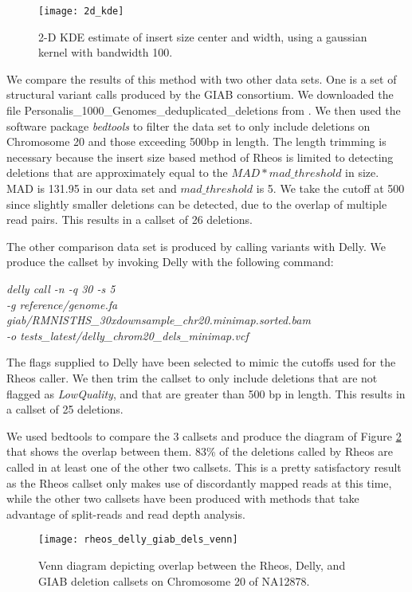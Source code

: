 \begin{figure}[H]
    \texttt{[image: 2d\_kde]}
    \centering
    \caption {2-D KDE estimate of insert size center and width, using a gaussian kernel with bandwidth 100.}
    \label{fig:2d_kde}
\end{figure}

We compare the results of this method with two other data sets. One is a set of structural variant calls produced by the GIAB consortium. We downloaded the file Personalis\_1000\_Genomes\_deduplicated\_deletions from \autocite{giab_svs}. We then used the software package \emph{bedtools}\autocite{quinlan2010bedtools} to filter the data set to only include deletions on Chromosome 20 and those exceeding 500bp in length. The length trimming is necessary because the insert size based method of Rheos is limited to detecting deletions that are approximately equal to the $MAD * mad\_threshold$ in size. MAD is 131.95 in our data set and $mad\_threshold$ is 5. We take the cutoff at 500 since slightly smaller deletions can be detected, due to the overlap of multiple read pairs. This results in a callset of 26 deletions.

The other comparison data set is produced by calling variants with Delly\autocite{rausch2012delly}. We produce the callset by invoking Delly with the following command:

\emph{delly call -n -q 30 -s 5\\
 -g reference/genome.fa giab/RMNISTHS\_30xdownsample\_chr20.minimap.sorted.bam \\
 -o tests\_latest/delly\_chrom20\_dels\_minimap.vcf}

The flags supplied to Delly have been selected to mimic the cutoffs used for the Rheos caller. We then trim the callset to only include deletions that are not flagged as \emph{LowQuality}, and that are greater than 500 bp in length. This results in a callset of 25 deletions.

We used bedtools to compare the 3 callsets and produce the diagram of Figure \ref{fig:rheos_delly_giab_dels_venn} that shows the overlap between them. 83\% of the deletions called by Rheos are called in at least one of the other two callsets. This is a pretty satisfactory result as the Rheos callset only makes use of discordantly mapped reads at this time, while the other two callsets have been produced with methods that take advantage of split-reads and read depth analysis. 

\begin{figure}[h!]
    \texttt{[image: rheos\_delly\_giab\_dels\_venn]}
    \centering
    \caption {Venn diagram depicting overlap between the Rheos, Delly, and GIAB deletion callsets on Chromosome 20 of NA12878.}
    \label{fig:rheos_delly_giab_dels_venn}
\end{figure}

